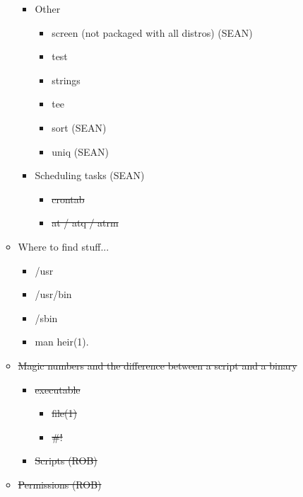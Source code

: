 \documentclass[12pt]{article}
\begin{document}
\begin{itemize}
\begin{itemize}
\begin{itemize}
			\item Other 
			\begin{itemize}
				\item screen (not packaged with all distros) (SEAN) 
				\item test 
				\item strings 
				\item tee 
				\item sort (SEAN)
				\item uniq (SEAN)
			\end{itemize}
			\item Scheduling tasks  (SEAN)
			\begin{itemize}
				\item \sout{crontab}
				\item \sout{at / atq / atrm }
			\end{itemize}
		\end {itemize} 
		\item Where to find stuff... 
		\begin{itemize}
			\item /usr 
			\item /usr/bin 
			\item /sbin 
			\item man heir(1). 
		\end{itemize}
		\item \sout {Magic numbers and the difference between a script and a binary} 
		\begin{itemize}
			\item \sout {executable}
			\begin{itemize}
				\item \sout {file(1)} 
				\item \sout {\#!} 
			\end{itemize}
			\item \sout {Scripts  (ROB)}
		\end{itemize}
		\item \sout {Permissions (ROB)}
		

\end{itemize}
\end{itemize}
\end{document}
